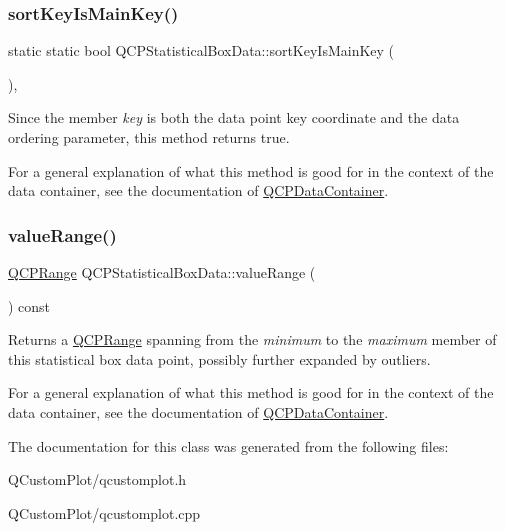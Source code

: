 \subsubsection{\texorpdfstring{sort\+Key\+Is\+Main\+Key()}{sortKeyIsMainKey()}}
{\footnotesize\ttfamily static static bool Q\+C\+P\+Statistical\+Box\+Data\+::sort\+Key\+Is\+Main\+Key (\begin{DoxyParamCaption}{ }\end{DoxyParamCaption})\hspace{0.3cm}{\ttfamily [inline]}, {\ttfamily [static]}}

Since the member {\itshape key} is both the data point key coordinate and the data ordering parameter, this method returns true.

For a general explanation of what this method is good for in the context of the data container, see the documentation of \mbox{\hyperlink{class_q_c_p_data_container}{Q\+C\+P\+Data\+Container}}. \mbox{\label{class_q_c_p_statistical_box_data_a1a2410fcf3d45fa3a1ad09e265b9bcad}} 
\subsubsection{\texorpdfstring{value\+Range()}{valueRange()}}
{\footnotesize\ttfamily \mbox{\hyperlink{class_q_c_p_range}{Q\+C\+P\+Range}} Q\+C\+P\+Statistical\+Box\+Data\+::value\+Range (\begin{DoxyParamCaption}{ }\end{DoxyParamCaption}) const\hspace{0.3cm}{\ttfamily [inline]}}

Returns a \mbox{\hyperlink{class_q_c_p_range}{Q\+C\+P\+Range}} spanning from the {\itshape minimum} to the {\itshape maximum} member of this statistical box data point, possibly further expanded by outliers.

For a general explanation of what this method is good for in the context of the data container, see the documentation of \mbox{\hyperlink{class_q_c_p_data_container}{Q\+C\+P\+Data\+Container}}. 

The documentation for this class was generated from the following files\+:\begin{DoxyCompactItemize}
\item 
Q\+Custom\+Plot/qcustomplot.\+h\item 
Q\+Custom\+Plot/qcustomplot.\+cpp\end{DoxyCompactItemize}

